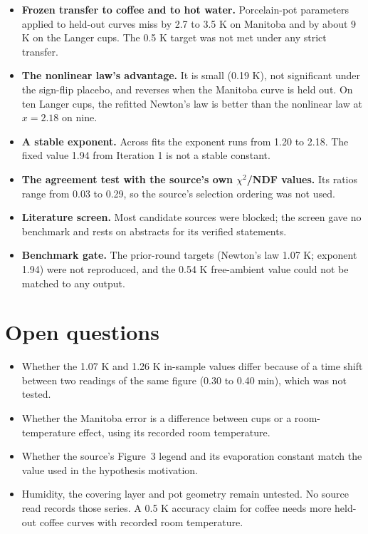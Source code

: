 \documentclass[11pt,letterpaper]{article}
\begin{document}
\begin{itemize}
\item \textbf{Frozen transfer to coffee and to hot water.} Porcelain-pot parameters applied to held-out curves miss by 2.7 to 3.5 K on Manitoba and by about 9 K on the Langer cups. The 0.5 K target was not met under any strict transfer.
\item \textbf{The nonlinear law's advantage.} It is small (0.19 K), not significant under the sign-flip placebo, and reverses when the Manitoba curve is held out. On ten Langer cups, the refitted Newton's law is better than the nonlinear law at $x = 2.18$ on nine.
\item \textbf{A stable exponent.} Across fits the exponent runs from 1.20 to 2.18. The fixed value 1.94 from Iteration 1 is not a stable constant.
\item \textbf{The agreement test with the source's own $\chi^2$/NDF values.} Its ratios range from 0.03 to 0.29, so the source's selection ordering was not used.
\item \textbf{Literature screen.} Most candidate sources were blocked; the screen gave no benchmark and rests on abstracts for its verified statements.
\item \textbf{Benchmark gate.} The prior-round targets (Newton's law 1.07 K; exponent 1.94) were not reproduced, and the 0.54 K free-ambient value could not be matched to any output.
\end{itemize}

\section*{Open questions}

\begin{itemize}
\item Whether the 1.07 K and 1.26 K in-sample values differ because of a time shift between two readings of the same figure (0.30 to 0.40 min), which was not tested.
\item Whether the Manitoba error is a difference between cups or a room-temperature effect, using its recorded room temperature.
\item Whether the source's Figure~3 legend and its evaporation constant match the value used in the hypothesis motivation.
\item Humidity, the covering layer and pot geometry remain untested. No source read records those series. A 0.5 K accuracy claim for coffee needs more held-out coffee curves with recorded room temperature.
\end{itemize}
\end{document}
